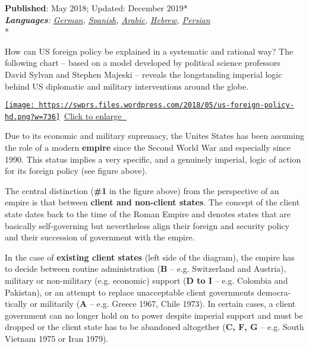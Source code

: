 \textbf{Published}: May 2018; Updated: December 2019*\\
\emph{\textbf{Languages}:
\href{https://swprs.org/logik-imperialer-kriege/}{German},
\href{https://swprs.files.wordpress.com/2019/12/logic-of-us-foreign-policy-spanish.pdf}{Spanish},
\href{https://swprs.org/the-logic-of-us-foreign-policy-arabic/}{Arabic},
\href{https://swprs.org/us-foreign-policy-hebrew/}{Hebrew},
\href{https://swprs.files.wordpress.com/2019/12/logic-of-us-foreign-policy-persian.pdf}{Persian}}\\
*

How can US foreign policy be explained in a systematic and rational way?
The following chart -- based on a model developed by political science
professors David Sylvan and Stephen Majeski -- reveals the longstanding
imperial logic behind US diplomatic and military interventions around
the globe.

\href{https://swprs.files.wordpress.com/2018/05/us-foreign-policy-hd.png}{\texttt{[image: https://swprs.files.wordpress.com/2018/05/us-foreign-policy-hd.png?w=736]}}~\href{https://swprs.files.wordpress.com/2018/05/us-foreign-policy-hd.png}{Click
to enlarge 🔎}

Due to its economic and military supremacy, the Unites States has been
assuming the role of a modern \textbf{empire} since the Second World War
and especially since 1990. This status implies a very specific, and a
genuinely imperial, logic of action for its foreign policy (see figure
above).

The central distinction (\textbf{\#1} in the figure above) from the
perspective of an empire is that between \textbf{client and non-client
states}. The concept of the client state dates back to the time of the
Roman Empire and denotes states that are basically self-governing but
nevertheless align their foreign and security policy and their
succession of government with the empire.

In the case of \textbf{existing client states} (left side of the
diagram), the empire has to decide between routine administration
(\textbf{B} -- e.g. Switzerland and Austria), military or non-military
(e.g. economic) support (\textbf{D to I} -- e.g. Colombia and Pakistan),
or an attempt to replace unacceptable client governments
demo­cra­tically or militarily (\textbf{A} -- e.g. Greece 1967, Chile
1973). In certain cases, a client government can no longer hold on to
power despite imperial support and must be dropped or the client state
has to be abandoned altogether (\textbf{C, F, G} -- e.g. South Vietnam
1975 or Iran 1979).

